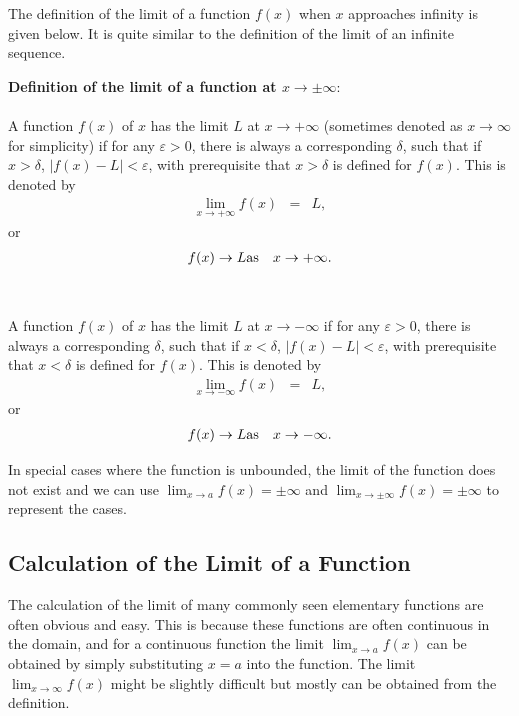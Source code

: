 The definition of the limit of a function $f(x)$ when $x$ approaches infinity is given below. It is quite similar to the definition of the limit of an infinite sequence.
\begin{VF}
\textbf{Definition of the limit of a function at $x\rightarrow \pm \infty$}:
\\
\\
\noindent A function $f(x)$ of $x$ has the limit $L$ at $x \rightarrow +\infty$ (sometimes denoted as $x \rightarrow \infty$ for simplicity) if for any $\varepsilon > 0$, there is always a corresponding $\delta$, such that if $x > \delta$, $|f(x)-L| < \varepsilon$, with prerequisite that $x > \delta$ is defined for $f(x)$. This is denoted by
\begin{eqnarray}
   \lim_{x\rightarrow +\infty} f(x) &=& L, \nonumber
\end{eqnarray}
or
\begin{eqnarray}
  f(x) \rightarrow L & \textup{as} & x \rightarrow +\infty. \nonumber
\end{eqnarray}
\\
\\
\noindent A function $f(x)$ of $x$ has the limit $L$ at $x \rightarrow -\infty$ if for any $\varepsilon > 0$, there is always a corresponding $\delta$, such that if $x < \delta$, $|f(x)-L| < \varepsilon$, with prerequisite that $x < \delta$ is defined for $f(x)$. This is denoted by
\begin{eqnarray}
   \lim_{x\rightarrow -\infty} f(x) &=& L, \nonumber
\end{eqnarray}
or
\begin{eqnarray}
  f(x) \rightarrow L & \textup{as} & x \rightarrow -\infty. \nonumber
\end{eqnarray}
\end{VF}

In special cases where the function is unbounded, the limit of the function does not exist and we can use $\lim_{x\rightarrow a}f(x) = \pm \infty$ and $\lim_{x\rightarrow \pm \infty}f(x) = \pm \infty$ to represent the cases.

\subsection{Calculation of the Limit of a Function} \label{ch1subsec:calculationlimitfunction}

The calculation of the limit of many commonly seen elementary functions are often obvious and easy. This is because these functions are often continuous in the domain, and for a continuous function the limit $\lim_{x\rightarrow a}f(x)$ can be obtained by simply substituting $x=a$ into the function. The limit $\lim_{x\rightarrow \infty}f(x)$ might be slightly difficult but mostly can be obtained from the definition.

